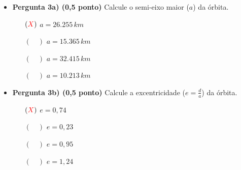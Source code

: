 \documentclass[a4paper, 12pt]{article}
\newcommand{\red}[1]{\textcolor{red}{#1}}
\begin{document}
\begin{flushleft}
\begin{itemize}
\begin{figure}[H]
            \end{figure}
            \begin{itemize}
                \item \textbf{Pergunta 3a) (0,5 ponto)} Calcule o semi-eixo maior ($a$) da órbita.
                    \begin{itemize}
                        \item[$(\red{X})$] $a = 26.255 \, km$
                        \item[$(\quad)$] $a = 15.365 \, km$
                        \item[$(\quad)$] $a = 32.415 \, km$
                        \item[$(\quad)$] $a = 10.213 \, km$
                    \end{itemize}
                \item \textbf{Pergunta 3b) (0,5 ponto)} Calcule a excentricidade  ($e= \frac{d}{a}$) da órbita.
                    \begin{itemize}
                        \item[$(\red{X})$] $e = 0,74$
                        \item[$(\quad)$] $e = 0,23$
                        \item[$(\quad)$] $e = 0,95$
                        \item[$(\quad)$] $e = 1,24$
                    \end{itemize}
            \end{itemize}


\end{itemize}
\end{flushleft}
\end{document}

